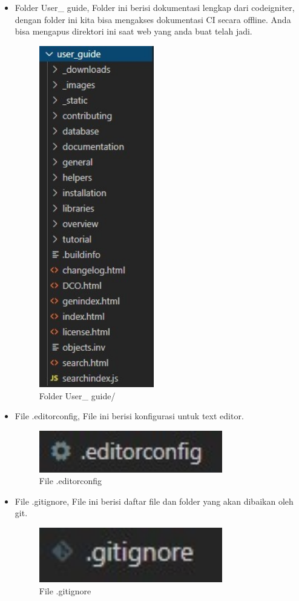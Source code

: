 \begin{itemize}
\begin{itemize}
		\item Folder User\_ guide, Folder ini berisi dokumentasi lengkap dari codeigniter, dengan folder ini kita bisa mengakses dokumentasi CI secara offline. Anda bisa mengapus direktori ini saat web yang anda buat telah jadi.		
		\begin{figure}[H]
			\includegraphics[width=5cm]{figures/instalasi/ci9-1.jpg}
			\centering
			\caption{Folder User\_ guide/}
		\end{figure}	
		
		\item File .editorconfig, File ini berisi konfigurasi untuk text editor.		
		\begin{figure}[H]
			\includegraphics[width=8cm]{figures/instalasi/ci10.jpg}
			\centering
			\caption{File .editorconfig}
		\end{figure}

		\item File .gitignore, File ini berisi daftar file dan folder yang akan dibaikan oleh git.		
		\begin{figure}[H]
			\includegraphics[width=8cm]{figures/instalasi/ci11.jpg}
			\centering
			\caption{File .gitignore}
		\end{figure}


\end{itemize}
\end{itemize}
